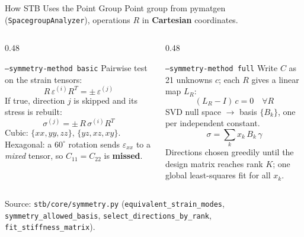 \documentclass[8pt]{beamer}
\begin{document}
\begin{frame}{How STB Uses the Point Group}
	\relax
	{\small Point group from pymatgen (\texttt{SpacegroupAnalyzer}), operations
	$R$ in \textbf{Cartesian} coordinates.}
	\par\vspace{0.15cm}
	\begin{columns}[T]
		\begin{column}{0.48\textwidth}
			\begin{block}{\texttt{--symmetry-method basic}}
				Pairwise test on the strain tensors:
				\[ R\,\varepsilon^{(i)}R^{T} = \pm\,\varepsilon^{(j)} \]
				If true, direction $j$ is skipped and its stress is rebuilt:
				\[ \sigma^{(j)} = \pm\,R\,\sigma^{(i)}R^{T} \]
				{\scriptsize Cubic: $\{xx,yy,zz\}$, $\{yz,xz,xy\}$.
				Hexagonal: a $60^\circ$ rotation sends $\varepsilon_{xx}$ to a
				\emph{mixed} tensor, so $C_{11}=C_{22}$ is \textbf{missed}.}
			\end{block}
		\end{column}
		\begin{column}{0.48\textwidth}
			\begin{block}{\texttt{--symmetry-method full}}
				Write $C$ as 21 unknowns $c$; each $R$ gives a linear map $L_R$:
				\[ (L_R - I)\,c = 0 \quad \forall R \]
				SVD null space $\rightarrow$ basis $\{B_k\}$, one per independent constant.
				\[ \sigma = \textstyle\sum_k x_k\,B_k\,\gamma \]
				{\scriptsize Directions chosen greedily until the design matrix reaches
				rank $K$; one global least-squares fit for all $x_k$.}
			\end{block}
		\end{column}
	\end{columns}
	\vspace{0.15cm}
	{\scriptsize Source: \texttt{stb/core/symmetry.py}
	(\texttt{equivalent\_strain\_modes}, \texttt{symmetry\_allowed\_basis},
	\texttt{select\_directions\_by\_rank}, \texttt{fit\_stiffness\_matrix}).}
\end{frame}
\end{document}
